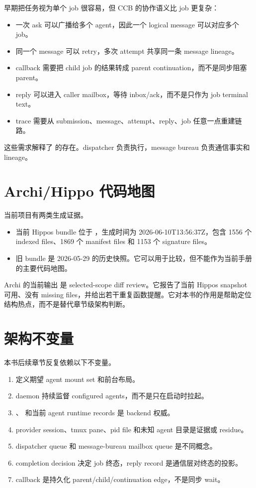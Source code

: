 早期把任务视为单个 job 很容易，但 CCB 的协作语义比 job 更复杂：

\begin{itemize}
  \item 一次 ask 可以广播给多个 agent，因此一个 logical message 可以对应多个 job。
  \item 同一个 message 可以 retry，多次 attempt 共享同一条 message lineage。
  \item callback 需要把 child job 的结果转成 parent continuation，而不是同步阻塞 parent。
  \item reply 可以进入 caller mailbox，等待 inbox/ack，而不是只作为 job terminal text。
  \item trace 需要从 submission、message、attempt、reply、job 任意一点重建链路。
\end{itemize}

这些需求解释了  的存在。dispatcher 负责执行，message bureau 负责通信事实和 lineage。

\section{Archi/Hippo 代码地图}

当前项目有两类生成证据。

\begin{itemize}
  \item 当前 Hippos bundle 位于 ，生成时间为 2026-06-10T13:56:37Z，包含 1556 个 indexed files、1869 个 manifest files 和 1153 个 signature files。
  \item 旧  bundle 是 2026-05-29 的历史快照。它可以用于比较，但不能作为当前手册的主要代码地图。
\end{itemize}

Archi 的当前输出  是 selected-scope diff review。它报告了当前 Hippos snapshot 可用、没有 missing files，并给出若干重复函数提醒。它对本书的作用是帮助定位结构热点，而不是替代章节级架构判断。

\section{架构不变量}

本书后续章节反复依赖以下不变量。

\begin{enumerate}
  \item {} 定义期望 agent mount set 和前台布局。
  \item daemon 持续监督 configured agents，而不是只在启动时拉起。
  \item {}、 和当前 agent runtime records 是 backend 权威。
  \item provider session、tmux pane、pid file 和未知 agent 目录是证据或 residue。
  \item dispatcher queue 和 message-bureau mailbox queue 是不同概念。
  \item completion decision 决定 job 终态，reply record 是通信层对终态的投影。
  \item callback 是持久化 parent/child/continuation edge，不是同步 wait。
\end{enumerate}
